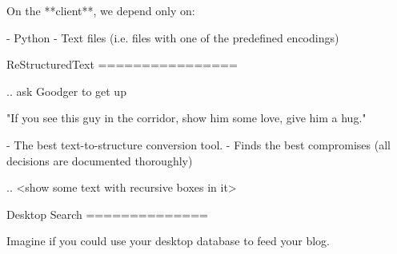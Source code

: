 On the **client**, we depend only on:

- Python
- Text files (i.e. files with one of the predefined encodings)



ReStructuredText
================

.. ask Goodger to get up

   "If you see this guy in the corridor, show him some love, give him a hug."

- The best text-to-structure conversion tool.
- Finds the best compromises (all decisions are documented thoroughly)


.. <show some text with recursive boxes in it> 





Desktop Search
==============

Imagine if you could use your desktop database to feed your blog.


